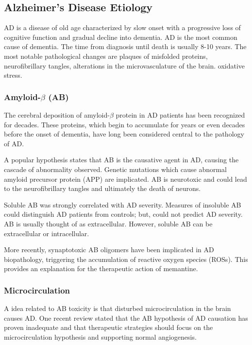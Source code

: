 \documentclass[twocolumn]{article}
\begin{document}
\subsection{Alzheimer's Disease Etiology}

AD is a disease of old age
characterized by slow onset with a
progressive loss of cognitive function and gradual decline into dementia.
AD is the most common cause of dementia.
The time from diagnosis until death is usually 8-10 years.
The most notable pathological changes are plaques of misfolded proteins,
neurofibrillary tangles, alterations in the microvasculature of the brain.
oxidative stress.

\subsubsection{Amyloid-$\beta$ (AB)}

The cerebral deposition of amyloid-$\beta$ protein in AD patients
has been recognized for decades.
These proteins, which begin to accumulate
for years or even decades before the onset of dementia,
 have long been considered central to the pathology of AD.
\cite{citron1992mutation}

A popular hypothesis states that AB is the causative agent in AD,
causing the cascade of abnormality observed. Genetic mutations
which cause abnormal amyloid precursor protein (APP) are implicated.
AB is neurotoxic and could lead to the neurofibrillary tangles
and ultimately the death of neurons.
\cite{hardy1992alzheimer}


Soluble AB was strongly correlated with AD severity.
Measures of insoluble AB could distinguish AD patients from
controls; but, could not predict AD severity.
AB is usually thought of as extracellular.
However, soluble AB can be extracellular or intracellular.
\cite{mclean1999soluble}


More recently, synaptotoxic AB oligomers have been implicated
in AD biopathology,
triggering the accumulation of reactive oxygen species (ROSs).
This provides an explanation for the therapeutic action
of memantine.
\cite{klein2013synaptotoxic}



\subsubsection{Microcirculation}

A idea related to AB toxicity is that disturbed microcirculation in the brain
causes AD.
\cite{de1993can}
One recent review stated that the AB hypothesis of AD causation has
proven inadequate and that therapeutic strategies should
focus on the microcirculation hypothesis and supporting normal angiogenesis.
\cite{drachman2014amyloid}
\end{document}
